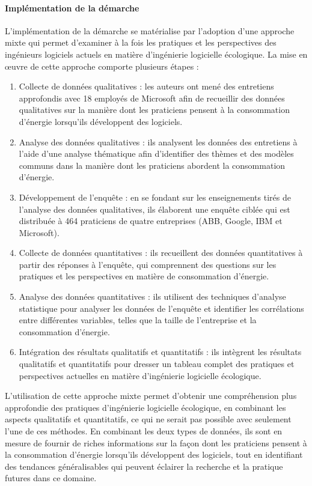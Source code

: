 \paragraph{Implémentation de la démarche}
L'implémentation de la démarche se matérialise par l'adoption d'une approche mixte qui permet d'examiner à la fois les pratiques et les perspectives des ingénieurs logiciels actuels en matière d'ingénierie logicielle écologique. La mise en œuvre de cette approche comporte plusieurs étapes :
\begin{enumerate}
    \item Collecte de données qualitatives : les auteurs ont mené des entretiens approfondis avec 18 employés de Microsoft afin de recueillir des données qualitatives sur la manière dont les praticiens pensent à la consommation d'énergie lorsqu'ils développent des logiciels.
    \item Analyse des données qualitatives : ils analysent les données des entretiens à l'aide d'une analyse thématique afin d'identifier des thèmes et des modèles communs dans la manière dont les praticiens abordent la consommation d'énergie.
    \item Développement de l'enquête : en se fondant sur les enseignements tirés de l'analyse des données qualitatives, ils élaborent une enquête ciblée qui est distribuée à 464 praticiens de quatre entreprises (ABB, Google, IBM et Microsoft).
    \item Collecte de données quantitatives : ils recueillent des données quantitatives à partir des réponses à l'enquête, qui comprennent des questions sur les pratiques et les perspectives en matière de consommation d'énergie.
    \item Analyse des données quantitatives : ils utilisent des techniques d'analyse statistique pour analyser les données de l'enquête et identifier les corrélations entre différentes variables, telles que la taille de l'entreprise et la consommation d'énergie.
    \item Intégration des résultats qualitatifs et quantitatifs : ils intègrent les résultats qualitatifs et quantitatifs pour dresser un tableau complet des pratiques et perspectives actuelles en matière d'ingénierie logicielle écologique.
\end{enumerate}
L'utilisation de cette approche mixte permet d'obtenir une compréhension plus approfondie des pratiques d'ingénierie logicielle écologique, en combinant les aspects qualitatifs et quantitatifs, ce qui ne serait pas possible avec seulement l'une de ces méthodes. En combinant les deux types de données, ils sont en mesure de fournir de riches informations sur la façon dont les praticiens pensent à la consommation d'énergie lorsqu'ils développent des logiciels, tout en identifiant des tendances généralisables qui peuvent éclairer la recherche et la pratique futures dans ce domaine.

